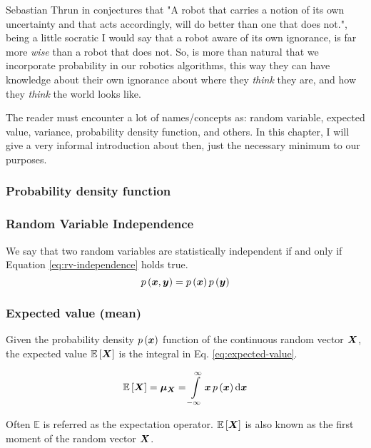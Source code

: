\documentclass[12pt]{article}
\begin{document}
Sebastian Thrun in \cite{thrun2000probabilistic} conjectures that "A robot that carries a notion of its own uncertainty and that acts accordingly, will do better than one that does not.", being a little socratic I would say that a robot aware of its own ignorance, is far more \textit{wise} than a robot that does not. So, is more than natural that we incorporate probability in our robotics algorithms, this way they can have knowledge about their own ignorance about where they \textit{think} they are, and how they \textit{think} the world looks like.

The reader must encounter a lot of names/concepts as: random variable, expected value, variance, probability density function, and others. In this chapter, I will give a very informal introduction about then, just the necessary minimum to our purposes.

\subsubsection{Probability density function}

\subsubsection{Random Variable Independence}
We say that two random variables are statistically independent if and only if Equation \ref{eq:rv-independence} holds true.
\begin{equation}
    \pr{\mb{x}, \mb{y}} = \pr{\mb{x}}\pr{\mb{y}}
    \label{eq:rv-independence}
\end{equation}

\subsubsection{Expected value (mean)}
Given the probability density $p\left({\boldsymbol{x}}\right)$ function of the continuous random vector ${\boldsymbol{X}}$, the expected value $\mathbb{E}\left[{\boldsymbol{X}}\right]$ is the integral in Eq. \ref{eq:expected-value}.

\begin{equation}
    \expv{\mb{X}} = \mb{\mu_X} = \Int[\mb{x}]{-\infty}{\infty}{\mb{x} \, \pr{\mb{x}}}
    \label{eq:expected-value}
\end{equation}

Often $\mathbb{E}$ is referred as the expectation operator. $\mathbb{E}\left[{\boldsymbol{X}}\right]$ is also known as the first moment of the random vector ${\boldsymbol{X}}$.
\end{document}
